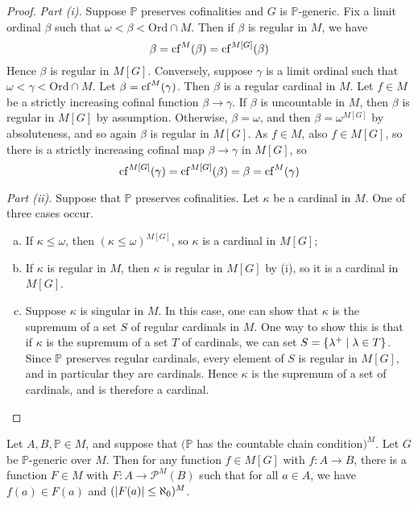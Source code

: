 \begin{proof}
    \emph{Part (i).}
    Suppose \( \mathbb P \) preserves cofinalities and \( G \) is \( \mathbb P \)-generic.
    Fix a limit ordinal \( \beta \) such that \( \omega < \beta < \mathrm{Ord} \cap M \).
    Then if \( \beta \) is regular in \( M \), we have
    \[ \beta = \operatorname{cf}^M(\beta) = \operatorname{cf}^{M[G]}(\beta) \]
    Hence \( \beta \) is regular in \( M[G] \).
    Conversely, suppose \( \gamma \) is a limit ordinal such that \( \omega < \gamma < \mathrm{Ord} \cap M \).
    Let \( \beta = \operatorname{cf}^M(\gamma) \).
    Then \( \beta \) is a regular cardinal in \( M \).
    Let \( f \in M \) be a strictly increasing cofinal function \( \beta \to \gamma \).
    If \( \beta \) is uncountable in \( M \), then \( \beta \) is regular in \( M[G] \) by assumption.
    Otherwise, \( \beta = \omega \), and then \( \beta = \omega^{M[G]} \) by absoluteness, and so again \( \beta \) is regular in \( M[G] \).
    As \( f \in M \), also \( f \in M[G] \), so there is a strictly increasing cofinal map \( \beta \to \gamma \) in \( M[G] \), so
    \[ \operatorname{cf}^{M[G]}(\gamma) = \operatorname{cf}^{M[G]}(\beta) = \beta = \operatorname{cf}^M(\gamma) \]

    \emph{Part (ii).}
    Suppose that \( \mathbb P \) preserves cofinalities.
    Let \( \kappa \) be a cardinal in \( M \).
    One of three cases occur.
    \begin{enumerate}[(a)]
        \item If \( \kappa \leq \omega \), then \( (\kappa \leq \omega)^{M[G]} \), so \( \kappa \) is a cardinal in \( M[G] \);
        \item If \( \kappa \) is regular in \( M \), then \( \kappa \) is regular in \( M[G] \) by (i), so it is a cardinal in \( M[G] \).
        \item Suppose \( \kappa \) is singular in \( M \).
        In this case, one can show that \( \kappa \) is the supremum of a set \( S \) of regular cardinals in \( M \).
        One way to show this is that if \( \kappa \) is the supremum of a set \( T \) of cardinals, we can set \( S = \qty{\lambda^+ \mid \lambda \in T} \).
        Since \( \mathbb P \) preserves regular cardinals, every element of \( S \) is regular in \( M[G] \), and in particular they are cardinals.
        Hence \( \kappa \) is the supremum of a set of cardinals, and is therefore a cardinal.
    \end{enumerate}
\end{proof}
\begin{lemma}
    Let \( A, B, \mathbb P \in M \), and suppose that \( (\mathbb P \) has the countable chain condition\( )^M \).
    Let \( G \) be \( \mathbb P \)-generic over \( M \).
    Then for any function \( f \in M[G] \) with \( f : A \to B \), there is a function \( F \in M \) with \( F : A \to \mathcal P^M(B) \) such that for all \( a \in A \), we have \( f(a) \in F(a) \) and \( (\abs{F(a)} \leq \aleph_0)^M \).
\end{lemma}
